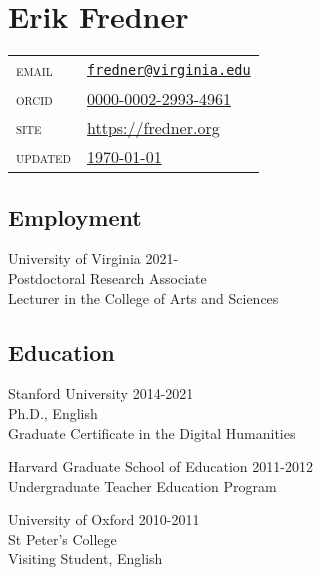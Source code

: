 \documentclass[
  12pt,
  letterpaper,
]{article}
\author{}
\date{}
\begin{document}
\hypertarget{erik-fredner}{%
\section{Erik Fredner}\label{erik-fredner}}

\begin{longtable}[]{@{}ll@{}}
\endhead
\endlastfoot
\textsc{email} &
\href{mailto:fredner@virginia.edu}{\nolinkurl{fredner@virginia.edu}} \\
\textsc{orcid} &
\href{https://orcid.org/0000-0002-2993-4961}{0000-0002-2993-4961} \\
\textsc{site} & \href{https://fredner.org}{https://fredner.org}\\
\textsc{updated} & \href{https://github.com/erikfredner/cv}{\today} \\
\end{longtable}

\hypertarget{employment}{%
\subsection{Employment}\label{employment}}

University of Virginia \hfill 2021-\\
\hspace*{0.333em} Postdoctoral Research Associate\\
\hspace*{0.333em} Lecturer in the College of Arts and Sciences

\hypertarget{education}{%
\subsection{Education}\label{education}}

Stanford University \hfill 2014-2021\\
\hspace*{0.333em} Ph.D., English\\
\hspace*{0.333em} Graduate Certificate in the Digital Humanities

Harvard Graduate School of Education \hfill 2011-2012\\
\hspace*{0.333em} Undergraduate Teacher Education Program

University of Oxford \hfill 2010-2011\\
\hspace*{0.333em} St Peter's College\\
\hspace*{0.333em} Visiting Student, English
\end{document}
